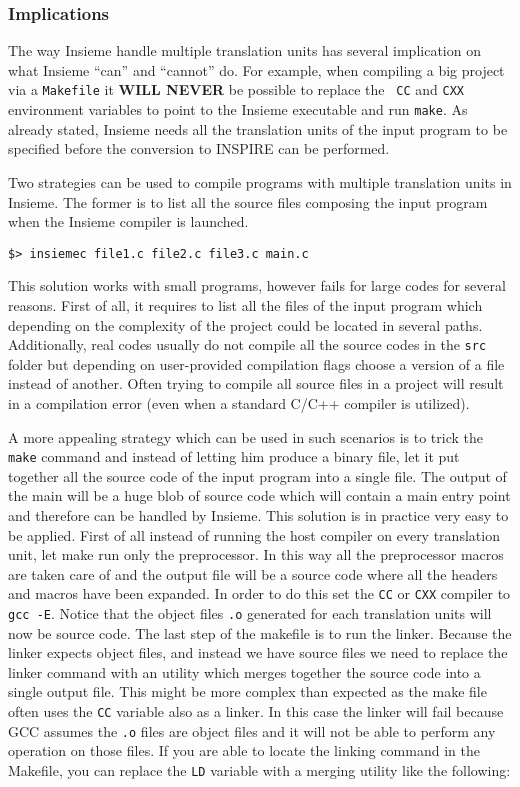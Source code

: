 \subsubsection{Implications}
The way Insieme handle multiple translation units has several implication on
what Insieme ``can'' and ``cannot'' do. For example, when compiling a big
project via a {\tt Makefile} it {\bf WILL NEVER} be possible to replace the {\tt
CC} and {\tt CXX} environment variables to point to the Insieme executable and
run {\tt make}. As already stated, Insieme needs all the translation units of
the input program to be specified before the conversion to INSPIRE can be
performed. 

Two strategies can be used to compile programs with multiple translation units 
in Insieme. The former is to list all the source files composing the input
program when the Insieme compiler is launched. 

\begin{verbatim}
$> insiemec file1.c file2.c file3.c main.c 
\end{verbatim}

This solution works with small programs, however fails for large codes for
several reasons. First of all, it requires to list all the files of the input
program which depending on the complexity of the project could be located in
several paths. Additionally, real codes usually do not compile all the source
codes in the {\tt src} folder but depending on user-provided compilation flags
choose a version of a file instead of another. Often trying to compile all
source files in a project will result in a compilation error (even when a
standard C/C++ compiler is utilized). 

A more appealing strategy which can be used in such scenarios is to trick the
{\tt make} command and instead of letting him produce a binary file, let it put
together all the source code of the input program into a single file. The
output of the main will be a huge blob of source code which will contain a main
entry point and therefore can be handled by Insieme. This solution is in
practice very easy to be applied. First of all instead of running the host
compiler on every translation unit, let make run only the preprocessor. In this
way all the preprocessor macros are taken care of and the output file will be a
source code where all the headers and macros have been expanded. In order to do
this set the {\tt CC} or {\tt CXX} compiler to {\tt gcc -E}. Notice that the
object files {\tt .o} generated for each translation units will now be source
code. The last step of the makefile is to run the linker. Because the linker
expects object files, and instead we have source files we need to replace the
linker command with an utility which merges together the source code into a
single output file. This might be more complex than expected as the make file
often uses the {\tt CC} variable also as a linker. In this case the linker will
fail because GCC assumes the {\tt .o} files are object files and it will not be
able to perform any operation on those files. If you are able to locate the
linking command in the Makefile, you can replace the {\tt LD} variable with a
merging utility like the following:

